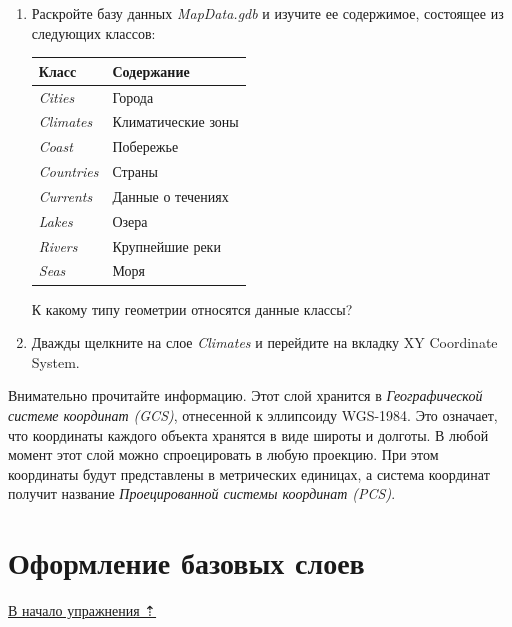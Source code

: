 \documentclass[]{book}
\theoremstyle{definition}
\theoremstyle{definition}
\theoremstyle{definition}
\theoremstyle{remark}
\begin{document}
\begin{enumerate}
\def\labelenumi{\arabic{enumi}.}
\setcounter{enumi}{2}
\item
  Раскройте базу данных \emph{MapData.gdb} и изучите ее содержимое,
  состоящее из следующих классов:

  \begin{longtable}[]{@{}ll@{}}
  \toprule
  \textbf{Класс} & \textbf{Содержание}\tabularnewline
  \midrule
  \endhead
  \emph{Cities} & Города\tabularnewline
  \emph{Climates} & Климатические зоны\tabularnewline
  \emph{Coast} & Побережье\tabularnewline
  \emph{Countries} & Страны\tabularnewline
  \emph{Currents} & Данные о течениях\tabularnewline
  \emph{Lakes} & Озера\tabularnewline
  \emph{Rivers} & Крупнейшие реки\tabularnewline
  \emph{Seas} & Моря\tabularnewline
  \bottomrule
  \end{longtable}

  К какому типу геометрии относятся данные классы?
\item
  Дважды щелкните на слое \emph{Climates} и перейдите на вкладку XY
  Coordinate System.
\end{enumerate}

Внимательно прочитайте информацию. Этот слой хранится в
\emph{Географической системе координат (GCS)}, отнесенной к эллипсоиду
WGS-1984. Это означает, что координаты каждого объекта хранятся в виде
широты и долготы. В любой момент этот слой можно спроецировать в любую
проекцию. При этом координаты будут представлены в метрических единицах,
а система координат получит название \emph{Проецированной системы
координат (PCS)}.

\hypertarget{map-design-climates-basic}{%
\section{Оформление базовых слоев}\label{map-design-climates-basic}}

\protect\hyperlink{map-design-climates}{В начало упражнения ⇡}
\end{document}
